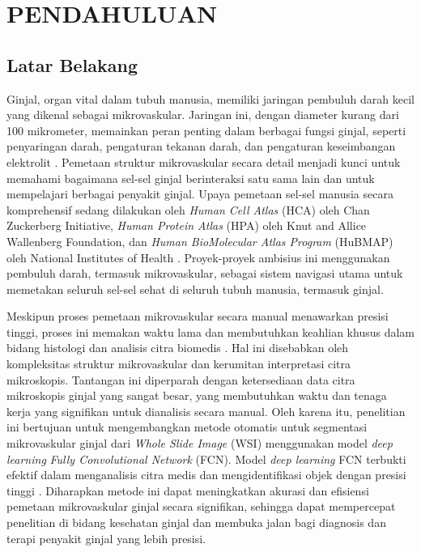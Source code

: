 \chapter{PENDAHULUAN}
\section{Latar Belakang}
\label{section:latarbelakang}
\noindent Ginjal, organ vital dalam tubuh manusia, memiliki jaringan pembuluh darah kecil yang dikenal sebagai mikrovaskular. Jaringan ini, dengan diameter kurang dari 100 mikrometer, memainkan peran penting dalam berbagai fungsi ginjal, seperti penyaringan darah, pengaturan tekanan darah, dan pengaturan keseimbangan elektrolit \cite{hu_multi-scale_2023}. Pemetaan struktur mikrovaskular secara detail menjadi kunci untuk memahami bagaimana sel-sel ginjal berinteraksi satu sama lain dan untuk mempelajari berbagai penyakit ginjal.
Upaya pemetaan sel-sel manusia secara komprehensif sedang dilakukan oleh \textit{Human Cell Atlas} (HCA) oleh Chan Zuckerberg Initiative, \textit{Human Protein Atlas} (HPA) oleh Knut and Allice Wallenberg Foundation, dan \textit{Human BioMolecular Atlas Program} (HuBMAP) oleh National Institutes of Health \cite{weber_considerations_2020}. Proyek-proyek ambisius ini menggunakan pembuluh darah, termasuk mikrovaskular, sebagai sistem navigasi utama untuk memetakan seluruh sel-sel sehat di seluruh tubuh manusia, termasuk ginjal.

\noindent Meskipun proses pemetaan mikrovaskular secara manual menawarkan presisi tinggi, proses ini memakan waktu lama dan membutuhkan keahlian khusus dalam bidang histologi dan analisis citra biomedis \cite{hu_multi-scale_2023,weber_considerations_2020}. Hal ini disebabkan oleh kompleksitas struktur mikrovaskular dan kerumitan interpretasi citra mikroskopis. Tantangan ini diperparah dengan ketersediaan data citra mikroskopis ginjal yang sangat besar, yang membutuhkan waktu dan tenaga kerja yang signifikan untuk dianalisis secara manual. Oleh karena itu, penelitian ini bertujuan untuk mengembangkan metode otomatis untuk segmentasi mikrovaskular ginjal dari \textit{Whole Slide Image} (WSI) menggunakan model \textit{deep learning} \textit{Fully Convolutional Network} (FCN). Model \textit{deep learning} FCN terbukti efektif dalam menganalisis citra medis dan mengidentifikasi objek dengan presisi tinggi \cite{huang_fully_2022}. Diharapkan metode ini dapat meningkatkan akurasi dan efisiensi pemetaan mikrovaskular ginjal secara signifikan, sehingga dapat mempercepat penelitian di bidang kesehatan ginjal dan membuka jalan bagi diagnosis dan terapi penyakit ginjal yang lebih presisi. 

